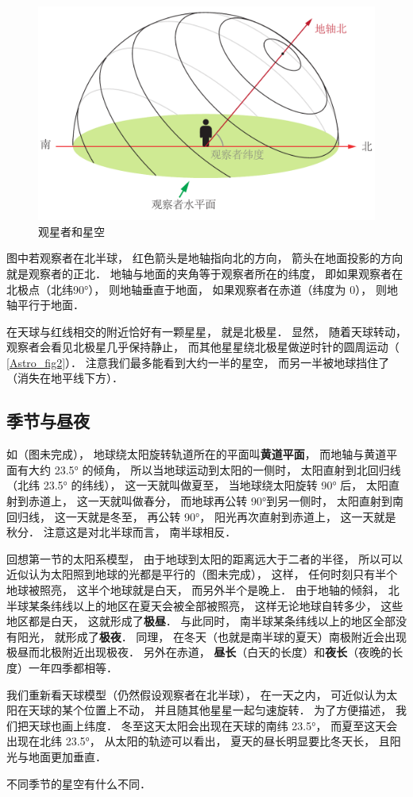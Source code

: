 \begin{figure}[ht]
\centering
\includegraphics[width=11.5cm]{./figures/Astro3.pdf}
\caption{观星者和星空} \label{Astro_fig3}
\end{figure}

图中若观察者在北半球， 红色箭头是地轴指向北的方向， 箭头在地面投影的方向就是观察者的正北． 地轴与地面的夹角等于观察者所在的纬度， 即如果观察者在北极点（北纬90°）， 则地轴垂直于地面， 如果观察者在赤道（纬度为 0）， 则地轴平行于地面．

在天球与红线相交的附近恰好有一颗星星， 就是北极星． 显然， 随着天球转动， 观察者会看见北极星几乎保持静止， 而其他星星绕北极星做逆时针的圆周运动（ \autoref{Astro_fig2}）． 注意我们最多能看到大约一半的星空， 而另一半被地球挡住了（消失在地平线下方）．

\subsection{季节与昼夜}

如（图未完成）， 地球绕太阳旋转轨道所在的平面叫\textbf{黄道平面}， 而地轴与黄道平面有大约 23.5° 的倾角， 所以当地球运动到太阳的一侧时， 太阳直射到北回归线（北纬 23.5° 的纬线）， 这一天就叫做夏至， 当地球绕太阳旋转 90° 后， 太阳直射到赤道上， 这一天就叫做春分， 而地球再公转 90°到另一侧时， 太阳直射到南回归线， 这一天就是冬至， 再公转 90°， 阳光再次直射到赤道上， 这一天就是秋分． 注意这是对北半球而言， 南半球相反．

回想第一节的太阳系模型， 由于地球到太阳的距离远大于二者的半径， 所以可以近似认为太阳照到地球的光都是平行的（图未完成）， 这样， 任何时刻只有半个地球被照亮， 这半个地球就是白天， 而另外半个是晚上． 由于地轴的倾斜， 北半球某条纬线以上的地区在夏天会被全部被照亮， 这样无论地球自转多少， 这些地区都是白天， 这就形成了\textbf{极昼}． 与此同时， 南半球某条纬线以上的地区全部没有阳光， 就形成了\textbf{极夜}． 同理， 在冬天（也就是南半球的夏天）南极附近会出现极昼而北极附近出现极夜． 另外在赤道， \textbf{昼长}（白天的长度）和\textbf{夜长}（夜晚的长度）一年四季都相等．


我们重新看天球模型（仍然假设观察者在北半球）， 在一天之内， 可近似认为太阳在天球的某个位置上不动， 并且随其他星星一起匀速旋转． 为了方便描述， 我们把天球也画上纬度． 冬至这天太阳会出现在天球的南纬 23.5°， 而夏至这天会出现在北纬 23.5°， 从太阳的轨迹可以看出， 夏天的昼长明显要比冬天长， 且阳光与地面更加垂直． 

不同季节的星空有什么不同．










